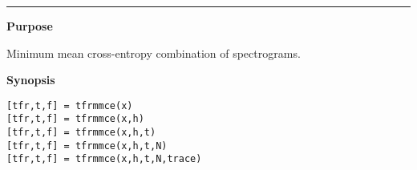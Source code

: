 

\hspace*{-1.6cm}{\Large \bf tfrmmce}

\vspace*{-.4cm}
\hspace*{-1.6cm}\rule[0in]{16.5cm}{.02cm}
\vspace*{.2cm}

{\bf \large {}\selectfont Purpose}\\
\hspace*{1.5cm}
\begin{minipage}[t]{13.5cm}
Minimum mean cross-entropy combination of spectrograms.
\end{minipage}
\vspace*{.5cm}

{\bf \large {}\selectfont Synopsis}\\
\hspace*{1.5cm}
\begin{minipage}[t]{13.5cm}
\begin{verbatim}
[tfr,t,f] = tfrmmce(x)
[tfr,t,f] = tfrmmce(x,h)
[tfr,t,f] = tfrmmce(x,h,t)
[tfr,t,f] = tfrmmce(x,h,t,N)
[tfr,t,f] = tfrmmce(x,h,t,N,trace)
\end{verbatim}
\end{minipage}
\vspace*{.5cm}

